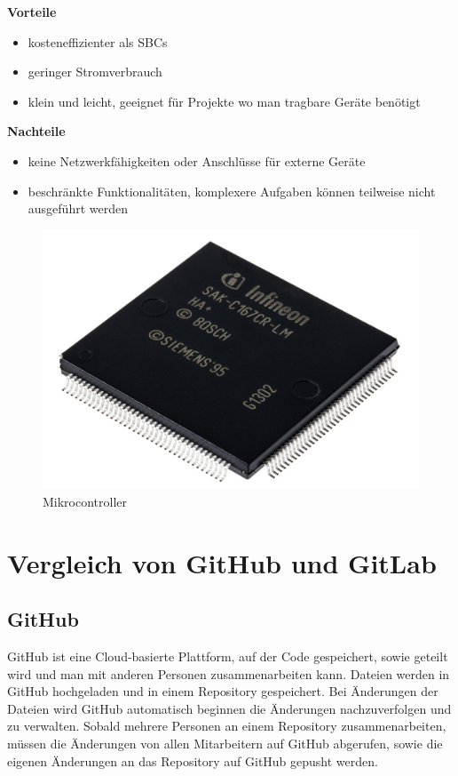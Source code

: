 \textbf{Vorteile}
\begin{itemize}
	\item kosteneffizienter als SBCs
	\item geringer Stromverbrauch
	\item klein und leicht, geeignet für Projekte wo man tragbare Geräte benötigt 
\end{itemize}

\textbf{Nachteile}
\begin{itemize}
	\item keine Netzwerkfähigkeiten oder Anschlüsse für externe Geräte
	\item beschränkte Funktionalitäten, komplexere Aufgaben können teilweise nicht ausgeführt werden
\end{itemize}

\begin{figure}[H]
	\centering
	\includegraphics[width=0.7\linewidth]{images/Mikrocontroller.jpg}
	\caption[Mikrocontroller]{Mikrocontroller}
	\label{fig:Mikrocontroller}
\end{figure}

\newpage
\section{Vergleich von GitHub und GitLab}
\subsection{GitHub}
GitHub ist eine Cloud-basierte Plattform, auf der Code gespeichert, sowie geteilt wird und man mit anderen Personen zusammenarbeiten kann. Dateien werden in GitHub hochgeladen und in einem Repository gespeichert. Bei Änderungen der Dateien wird GitHub automatisch beginnen die Änderungen nachzuverfolgen und zu verwalten. Sobald mehrere Personen an einem Repository zusammenarbeiten, müssen die Änderungen von allen Mitarbeitern auf GitHub abgerufen, sowie die eigenen Änderungen an das Repository auf GitHub gepusht werden. \parencite{GitHubUndGit}

